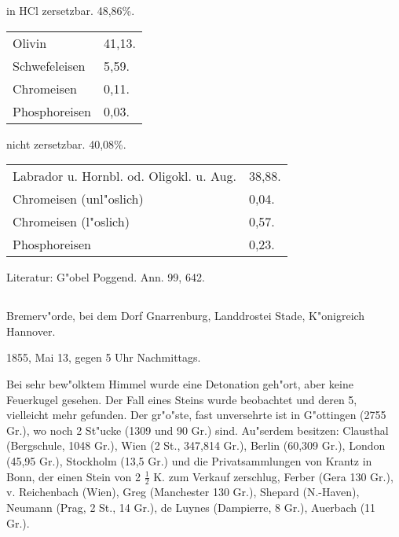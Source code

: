 \documentclass[a4paper, 11pt, oneside]{article}
\begin{document}
\begin{center}
in HCl zersetzbar. 48,86\%.
\end{center}

\begin{table}[H]
    \centering\swabfamily\Large
    \begin{tabular}{l l}
        \hline
        Olivin & 41,13. \\
        Schwefeleisen & 5,59. \\
        Chromeisen & 0,11. \\
        Phosphoreisen & 0,03. \\
    \end{tabular}
\end{table}

\begin{center}
nicht zersetzbar. 40,08\%.
\end{center}

\begin{table}[H]
    \centering\swabfamily\Large
    \begin{tabular}{l l}
        \hline
        Labrador u. Hornbl. od. Oligokl. u. Aug.  & 38,88. \\
        Chromeisen (unl"oslich) & 0,04. \\
        Chromeisen (l"oslich) & 0,57. \\
        Phosphoreisen & 0,23. \\
    \end{tabular}
\end{table}

\normalsize
Literatur: G"obel Poggend. Ann. 99, 642.

\subsection{}
\LARGE
\paragraph{}
Bremerv"orde, bei dem Dorf Gnarrenburg, Landdrostei Stade, K"onigreich Hannover.

1855, Mai 13, gegen 5 Uhr Nachmittags.

Bei sehr bew"olktem Himmel wurde eine Detonation geh"ort, aber keine Feuerkugel gesehen. Der Fall eines Steins wurde beobachtet und deren 5, vielleicht mehr gefunden. Der gr"o"ste, fast unversehrte ist in G"ottingen (2755 Gr.), wo noch 2 St"ucke (1309 und 90 Gr.) sind. Au"serdem besitzen: Clausthal (Bergschule, 1048 Gr.), Wien (2 St., 347,814 Gr.), Berlin (60,309 Gr.), London (45,95 Gr.), Stockholm (13,5 Gr.) und die Privatsammlungen von Krantz in Bonn, der einen Stein von 2 $\mathfrak{\frac{1}{2}}$ K. zum Verkauf zerschlug, Ferber (Gera 130 Gr.), v. Reichenbach (Wien), Greg (Manchester 130 Gr.), Shepard (N.-Haven), Neumann (Prag, 2 St., 14 Gr.), de Luynes (Dampierre, 8 Gr.), Auerbach (11 Gr.).
\end{document}
